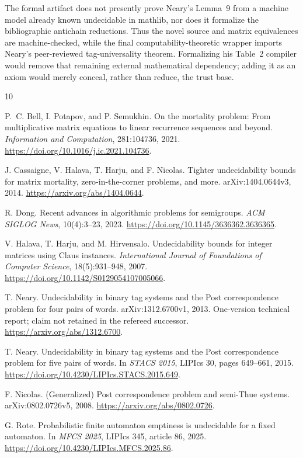 \documentclass[11pt]{article}
\begin{document}
The formal artifact does not presently prove Neary's Lemma~9 from a machine model already
known undecidable in mathlib, nor does it formalize the bibliographic antichain reductions.
Thus the novel source and matrix equivalences are machine-checked, while the final
computability-theoretic wrapper imports Neary's peer-reviewed tag-universality theorem.
Formalizing his Table~2 compiler would remove that remaining external mathematical
dependency; adding it as an axiom would merely conceal, rather than reduce, the trust base.

\begin{thebibliography}{10}

P.~C. Bell, I. Potapov, and P. Semukhin.
On the mortality problem: From multiplicative matrix equations to linear recurrence
sequences and beyond.
\emph{Information and Computation}, 281:104736, 2021.
\url{https://doi.org/10.1016/j.ic.2021.104736}.

J. Cassaigne, V. Halava, T. Harju, and F. Nicolas.
Tighter undecidability bounds for matrix mortality, zero-in-the-corner problems, and more.
arXiv:1404.0644v3, 2014.
\url{https://arxiv.org/abs/1404.0644}.

R. Dong.
Recent advances in algorithmic problems for semigroups.
\emph{ACM SIGLOG News}, 10(4):3--23, 2023.
\url{https://doi.org/10.1145/3636362.3636365}.

V. Halava, T. Harju, and M. Hirvensalo.
Undecidability bounds for integer matrices using Claus instances.
\emph{International Journal of Foundations of Computer Science}, 18(5):931--948, 2007.
\url{https://doi.org/10.1142/S0129054107005066}.

T. Neary.
Undecidability in binary tag systems and the Post correspondence problem for four pairs of
words.
arXiv:1312.6700v1, 2013.  One-version technical report; claim not retained in the refereed
successor.
\url{https://arxiv.org/abs/1312.6700}.

T. Neary.
Undecidability in binary tag systems and the Post correspondence problem for five pairs of
words.
In \emph{STACS 2015}, LIPIcs 30, pages 649--661, 2015.
\url{https://doi.org/10.4230/LIPIcs.STACS.2015.649}.

F. Nicolas.
(Generalized) Post correspondence problem and semi-Thue systems.
arXiv:0802.0726v5, 2008.
\url{https://arxiv.org/abs/0802.0726}.

G. Rote.
Probabilistic finite automaton emptiness is undecidable for a fixed automaton.
In \emph{MFCS 2025}, LIPIcs 345, article 86, 2025.
\url{https://doi.org/10.4230/LIPIcs.MFCS.2025.86}.

\end{thebibliography}
\end{document}
